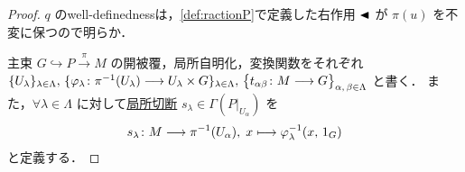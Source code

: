 \documentclass[geometry_main]{subfiles}
\begin{document}
\begin{proof}
    $q$ のwell-definednessは，\eqref{def:ractionP}で定義した右作用 $\blacktriangleleft$ が $\pi(u)$ を不変に保つので明らか．

    主束 $G \hookrightarrow P \xrightarrow{\pi} M$ の開被覆，局所自明化，変換関数をそれぞれ $\{U_\lambda\}_{\lambda \in \Lambda},\, \{\varphi_\lambda \colon \pi^{-1}(U_\lambda) \longrightarrow U_\lambda \times G\}_{\lambda \in \Lambda},\, \bigl\{ t_{\alpha\beta} \colon M \longrightarrow G \bigr\}_{\alpha,\, \beta \in \Lambda}$ と書く．
    また，$\forall \lambda \in \Lambda$ に対して\hyperref[def.section]{局所切断} $s_\lambda \in \Gamma(P|_{U_\alpha})$ を
    \begin{align}
        s_\lambda \colon M \longrightarrow \pi^{-1}(U_\alpha),\; x \longmapsto \varphi_\lambda^{-1}(x,\, 1_G)
    \end{align}
    と定義する．


\end{proof}
\end{document}
